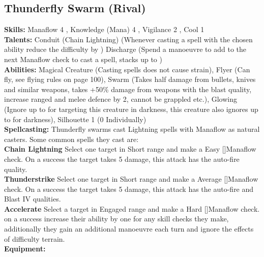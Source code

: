 \documentclass{article}
\newcommand\Easy{Easy [\Purple[1]]}
\newcommand\Average{Average [\Purple[2]]}
\newcommand\Hard{Hard [\Purple[3]]}
\begin{document}
\begin{multicols}{2}
{\subsection{Thunderfly Swarm (Rival)}
\begin{center}
\end{center}
\textbf{Skills:}
Manaflow 4 \Yellow[4]\Green[1],
Knowledge (Mana) 4 \Yellow[2]\Green[2],
Vigilance 2 \Yellow[2]\Green[2],
Cool 1 \Yellow[1]\Green[3]
\\\textbf{Talents:}
Conduit (Chain Lightning) (Whenever casting a spell with the chosen ability reduce the difficulty by \Purple[1])
Discharge (Spend a manoeuvre to add \Advantage\Advantage to the next Manaflow check to cast a spell, stacks up to \Advantage\Advantage\Advantage\Advantage)
\\\textbf{Abilities:}
Magical Creature (Casting spells does not cause strain),
Flyer (Can fly, see flying rules on page 100),
Swarm (Takes half damage from bullets, knives and similar weapons, takes +50\% damage from weapons with the blast quality, increase ranged and melee defence by 2, cannot be grappled etc.),
Glowing (Ignore up to \Black[1] for targeting this creature in darkness, this creature also ignores up to \Black[1] for darkness),
Silhouette 1 (0 Individually)
\\\textbf{Spellcasting:} Thunderfly swarms cast Lightning spells with Manaflow as natural casters. Some common spells they cast are: 
\\\textbf{Chain Lightning} Select one target in Short range and make a \Easy Manaflow check. On a success the target takes 5 damage, this attack has the auto-fire quality.
\\\textbf{Thunderstrike} Select one target in Short range and make a \Average Manaflow check. On a success the target takes 5 damage, this attack has the auto-fire and Blast IV qualities.
\\\textbf{Accelerate} Select a target in Engaged range and make a \Hard Manaflow check. on a success increase their ability by one for any skill checks they make, additionally they gain an additional manoeuvre each turn and ignore the effects of difficulty terrain.
\\\textbf{Equipment:}
}

\vbox{
}
\end{multicols}
\end{document}
